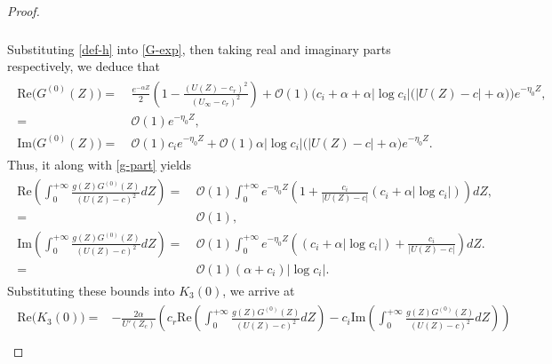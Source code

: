 \documentclass[10pt,a4paper]{amsart}
\begin{document}
\begin{proof}
\begin{align}
\begin{aligned}
			\end{aligned}\end{align}
	Substituting \eqref{def-h} into \eqref{G-exp}, then taking real and imaginary parts respectively, we deduce that
			\begin{align}\label{G-part}\begin{aligned}
					\text{Re}\big(G^{(0)}(Z)\big)=&~\frac{e^{-\alpha Z}}{2}\left(1-\frac{(U(Z)-c_r)^2}{(U_\infty-c_r)^2}\right) +\mathcal{O}(1)\Big(c_i+\alpha+\alpha|\log c_i|\big(|U(Z)-c|+\alpha\big)\Big)e^{-\eta_0Z},\\
					=&~\mathcal{O}(1)e^{-\eta_0Z},\\
					\text{Im}\big( G^{(0)}(Z)\big)=&~\mathcal{O}(1)c_ie^{-\eta_0Z}%
					+\mathcal{O}(1)\alpha|\log c_i|\big(|U(Z)-c|+\alpha\big)e^{-\eta_0 Z}.
			\end{aligned}\end{align}
			Thus, it along with \eqref{g-part} yields 
			\begin{align}\begin{aligned}
					\text{Re}\left(\int_{0}^{+\infty}\frac{g(Z)G^{(0)}(Z)}{(U(Z)-c)^2}dZ\right) =&~ \mathcal{O}(1)\int_{0}^{+\infty}e^{-\eta_0Z}\left(1+\frac{c_i}{|U(Z)-c|} \left(c_i+\alpha|\log c_i|\right)\right)dZ,\\
					=&~ \mathcal{O}(1),\\%
					\text{Im}\left(\int_{0}^{+\infty}\frac{g(Z)G^{(0)}(Z)}{(U(Z)-c)^2}dZ\right) =&~ \mathcal{O}(1)\int_{0}^{+\infty}e^{-\eta_0Z}\left(\left(c_i+\alpha|\log c_i|\right)+\frac{c_i}{|U(Z)-c|} \right)dZ.\\
					=&~ \mathcal{O}(1)(\alpha+c_i)|\log c_i|.\nonumber
			\end{aligned}\end{align}
	Substituting these bounds into $K_3(0)$, we arrive at
			\begin{align}\label{K3-0-im}\begin{aligned}
					\text{Re}\big(K_3(0)\big) =& -\frac{2\alpha}{U'(Z_c)}\left(c_r\text{Re}\left(\int_{0}^{+\infty}\frac{g(Z)G^{(0)}(Z)}{(U(Z)-c)^2}dZ\right) -c_i\text{Im}\left(\int_{0}^{+\infty}\frac{g(Z)G^{(0)}(Z)}{(U(Z)-c)^2}dZ\right) \right)\\

\end{aligned}
\end{align}
\end{proof}
\end{document}
